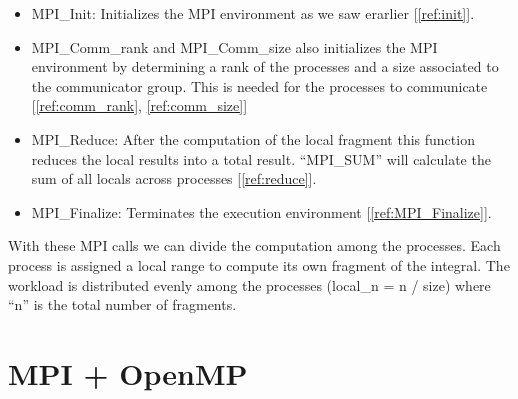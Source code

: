 \documentclass[11pt]{article}
\begin{document}
\begin{itemize}
    \begin{itemize}
        \item MPI\_Init: Initializes the MPI environment as we saw erarlier [\ref{ref:init}].
        \item MPI\_Comm\_rank and MPI\_Comm\_size also initializes the MPI environment by determining a rank of the processes and a size associated to the communicator group. This is needed for the processes to communicate [\ref{ref:comm_rank}, \ref{ref:comm_size}]
        \item MPI\_Reduce: After the computation of the local fragment this function reduces the local results into a total result. ``MPI\_SUM'' will calculate the sum of all locals across processes [\ref{ref:reduce}].
        \item MPI\_Finalize: Terminates the execution environment [\ref{ref:MPI_Finalize}].
    \end{itemize}
    With these MPI calls we can divide the computation among the processes. Each process is assigned a local range to compute its own fragment of the integral. The workload is distributed evenly among the processes (local\_n = n / size) where ``n'' is the total number of fragments.

\end{itemize}


\hypertarget{6}{%
\section{MPI + OpenMP}\label{6}}
\end{document}

